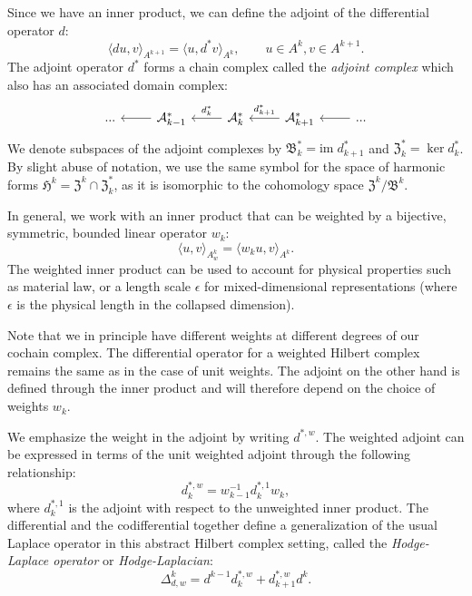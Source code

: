 \documentclass[reqno]{amsart}
\numberwithin{equation}{section}
\theoremstyle{definition}
\newcommand{\Hf}{\mathfrak{H}}
\newcommand{\Bf}{\mathfrak{B}}
\newcommand{\Zf}{\mathfrak{Z}}
\begin{document}
Since we have an inner product, we can define the adjoint of the differential operator $d$:
\begin{equation}
\langle du, v \rangle_{A^{k+1}} = \langle u, d^*v \rangle_{A^k}, \qquad u \in A^k, v \in A^{k+1}.
\end{equation}
The adjoint operator $d^*$ forms a chain complex called the \emph{adjoint complex} which also has an associated domain complex:
\begin{equation}
\begin{tikzcd}
	{...} & {\mathcal{A}^*_{k-1}} & {\mathcal{A}_{k}^*} & {\mathcal{A}^*_{k+1}} & {...}
	\arrow[from=1-2, to=1-1]
	\arrow["{d^*_k}"', from=1-3, to=1-2]
	\arrow["{d^*_{k+1}}"', from=1-4, to=1-3]
	\arrow[from=1-5, to=1-4]
\end{tikzcd}
\end{equation}
We denote subspaces of the adjoint complexes by $\mathfrak{B}^*_k = \mathrm{im} \; d^*_{k+1}$ and $\mathfrak{Z}_k^* = \ker d^*_k$. By slight abuse of notation, we use the same symbol for the space of harmonic forms $\Hf^k =\Zf^k \cap \Zf^*_k$, as it is isomorphic to the cohomology space $\Zf^k/\Bf^k$.

In general, we work with an inner product that can be weighted by a bijective, symmetric, bounded linear operator $w_k$: 
\begin{equation}
\langle u, v \rangle_{A^k_w} = \langle w_k u, v \rangle_{A^k}.
\end{equation}
The weighted inner product can be used to account for physical properties such as material law, or a length scale $\epsilon$ for mixed-dimensional representations (where $\epsilon$ is the physical length in the collapsed dimension).

Note that we in principle have different weights at different degrees of our cochain complex. The differential operator for a weighted Hilbert complex remains the same as in the case of unit weights. The adjoint on the other hand is defined through the inner product and will therefore depend on the choice of weights $w_k$.

We emphasize the weight in the adjoint by writing $d^{*, w}$. The weighted adjoint can be expressed in terms of the unit weighted adjoint through the following relationship:
\begin{equation}
d^{*, w}_k = w^{-1}_{k-1} d^{*,1}_k w_k,
\end{equation}
where $d^{*,1}_k$ is the adjoint with respect to the unweighted inner product.
The differential and the codifferential together define a generalization of the usual Laplace operator in this abstract Hilbert complex setting, called the \emph{Hodge-Laplace operator} or \emph{Hodge-Laplacian}:
\begin{equation}
\Delta_{d,w}^k = d^{k-1} d^{*,w}_k + d_{k+1}^{*,w} d^k.
\end{equation}
\end{document}
